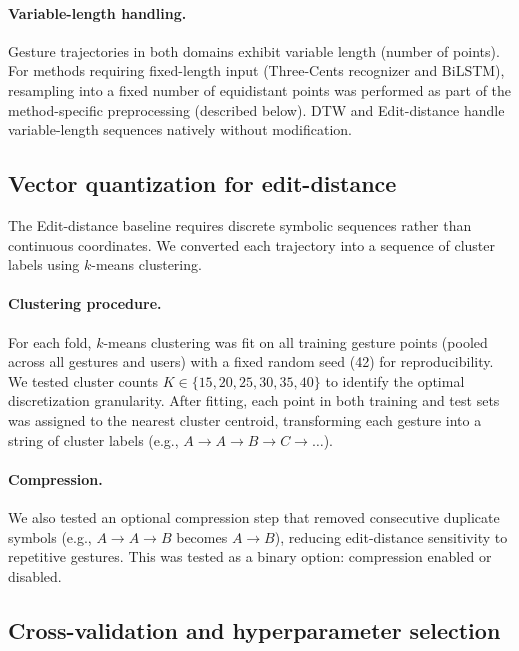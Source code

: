 \paragraph{Variable-length handling.} Gesture trajectories in
both domains exhibit variable length (number of
points). For methods requiring fixed-length input
(Three-Cents recognizer and BiLSTM), resampling
into a fixed number of equidistant points was
performed as part of the method-specific
preprocessing (described below). DTW and
Edit-distance handle variable-length sequences
natively without modification.
 
\subsection{Vector quantization for edit-distance}
 
The Edit-distance baseline requires discrete symbolic sequences rather than
continuous coordinates. We converted each trajectory into a sequence of cluster
labels using $k$-means clustering.
 
\paragraph{Clustering procedure.} For each fold, $k$-means clustering was fit on
all training gesture points (pooled across all gestures and users) with a fixed
random seed (42) for reproducibility. We tested cluster counts
$K \in \{15, 20, 25, 30, 35, 40\}$ to identify the optimal
discretization granularity. After fitting, each point in both training and test
sets was assigned to the nearest cluster centroid, transforming each gesture
into a string of cluster labels (e.g., $A \to A \to B \to C \to \dots$).
 
\paragraph{Compression.} We also tested an optional compression step that
removed consecutive duplicate symbols (e.g., $A \to A \to B$ becomes
$A \to B$), reducing edit-distance sensitivity to repetitive gestures. This
was tested as a binary option: compression enabled or disabled.
 
\subsection{Cross-validation and hyperparameter selection}
 
